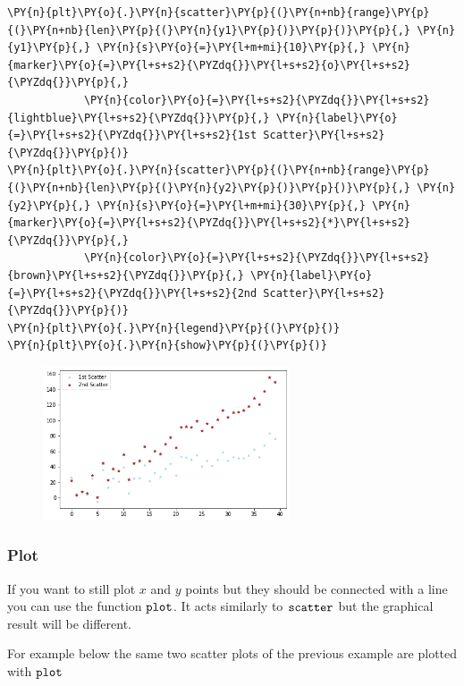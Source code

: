 \begin{tcolorbox}[breakable, size=fbox, boxrule=1pt, pad at break*=1mm,colback=cellbackground, colframe=cellborder]
\begin{Verbatim}[commandchars=\\\{\}]
\PY{n}{plt}\PY{o}{.}\PY{n}{scatter}\PY{p}{(}\PY{n+nb}{range}\PY{p}{(}\PY{n+nb}{len}\PY{p}{(}\PY{n}{y1}\PY{p}{)}\PY{p}{)}\PY{p}{,} \PY{n}{y1}\PY{p}{,} \PY{n}{s}\PY{o}{=}\PY{l+m+mi}{10}\PY{p}{,} \PY{n}{marker}\PY{o}{=}\PY{l+s+s2}{\PYZdq{}}\PY{l+s+s2}{o}\PY{l+s+s2}{\PYZdq{}}\PY{p}{,} 
            \PY{n}{color}\PY{o}{=}\PY{l+s+s2}{\PYZdq{}}\PY{l+s+s2}{lightblue}\PY{l+s+s2}{\PYZdq{}}\PY{p}{,} \PY{n}{label}\PY{o}{=}\PY{l+s+s2}{\PYZdq{}}\PY{l+s+s2}{1st Scatter}\PY{l+s+s2}{\PYZdq{}}\PY{p}{)}
\PY{n}{plt}\PY{o}{.}\PY{n}{scatter}\PY{p}{(}\PY{n+nb}{range}\PY{p}{(}\PY{n+nb}{len}\PY{p}{(}\PY{n}{y2}\PY{p}{)}\PY{p}{)}\PY{p}{,} \PY{n}{y2}\PY{p}{,} \PY{n}{s}\PY{o}{=}\PY{l+m+mi}{30}\PY{p}{,} \PY{n}{marker}\PY{o}{=}\PY{l+s+s2}{\PYZdq{}}\PY{l+s+s2}{*}\PY{l+s+s2}{\PYZdq{}}\PY{p}{,} 
            \PY{n}{color}\PY{o}{=}\PY{l+s+s2}{\PYZdq{}}\PY{l+s+s2}{brown}\PY{l+s+s2}{\PYZdq{}}\PY{p}{,} \PY{n}{label}\PY{o}{=}\PY{l+s+s2}{\PYZdq{}}\PY{l+s+s2}{2nd Scatter}\PY{l+s+s2}{\PYZdq{}}\PY{p}{)}
\PY{n}{plt}\PY{o}{.}\PY{n}{legend}\PY{p}{(}\PY{p}{)}
\PY{n}{plt}\PY{o}{.}\PY{n}{show}\PY{p}{(}\PY{p}{)}
\end{Verbatim}
\end{tcolorbox}

\begin{figure}[h]
	\centering
	\includegraphics[width=0.65\textwidth]{figures/matplotlib_11_0.png}
\end{figure}

\subsubsection{Plot}\label{plot}

If you want to still plot \(x\) and \(y\) points but they should be
connected with a line you can use the function \(\tt{plot}\). It acts
similarly to \(\tt{scatter}\) but the graphical result will be
different.

For example below the same two scatter plots of the previous example are
plotted with \(\tt{plot}\)

